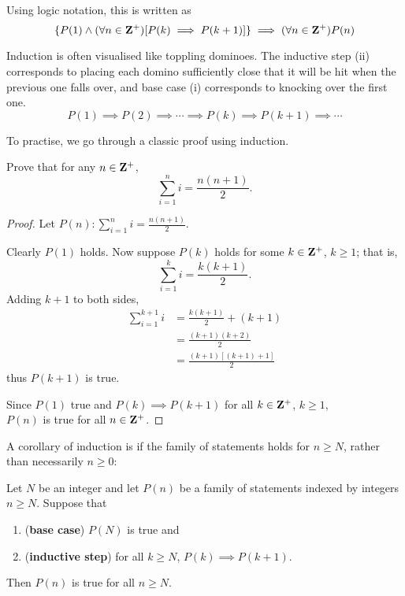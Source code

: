 Using logic notation, this is written as
\[ \{P(1) \land (\forall n \in \mathbf Z^+) [P(k) \implies P(k+1)]\} \implies (\forall n \in \mathbf Z^+)P(n) \]

\begin{remark}
Induction is often visualised like toppling dominoes. The inductive step (ii) corresponds to placing each domino sufficiently close that it will be hit when the previous one falls over, and base case (i) corresponds to knocking over the first one.
\[ P(1) \implies P(2) \implies \cdots \implies P(k) \implies P(k+1) \implies \cdots \]
\end{remark}

To practise, we go through a classic proof using induction.

\begin{exercise}
Prove that for any $n\in\mathbf Z^+$,
\[\sum_{i=1}^n i=\frac{n(n+1)}{2}.\]
\end{exercise}

\begin{proof}
Let $\displaystyle P(n):\sum_{i=1}^n i=\frac{n(n+1)}{2}$.

Clearly $P(1)$ holds. Now suppose $P(k)$ holds for some $k\in\mathbf Z^+$, $k\ge1$; that is,
\[\sum_{i=1}^k i=\frac{k(k+1)}{2}.\]
Adding $k+1$ to both sides,
\begin{align*}
\sum_{i=1}^{k+1} i&=\frac{k(k+1)}{2}+(k+1)\\
&=\frac{(k+1)(k+2)}{2}\\
&=\frac{(k+1)[(k+1)+1]}{2}
\end{align*}
thus $P(k+1)$ is true.

Since $P(1)$ true and $P(k)\implies P(k+1)$ for all $k\in\mathbf Z^+$, $k\ge1$,\\
$P(n)$ is true for all $n\in\mathbf Z^+$.
\end{proof}

A corollary of induction is if the family of statements holds for $n \ge N$, rather than necessarily $n \ge 0$:

\begin{corollary}
Let $N$ be an integer and let $P(n)$ be a family of statements indexed by integers $n \ge N$. Suppose that 
\begin{enumerate}[label=(\roman*)]
\item (\textbf{base case}) $P(N)$ is true and
\item (\textbf{inductive step}) for all $k \ge N$, $P(k) \implies P(k+1)$. 
\end{enumerate}
Then $P(n)$ is true for all $n \ge N$.
\end{corollary}

